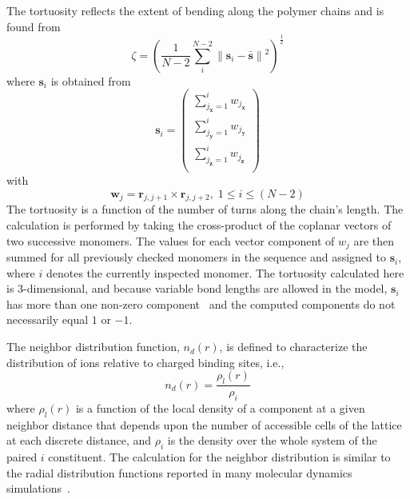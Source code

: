 \documentclass[
journal=jcisd8, %
manuscript=article,
layout=twocolumn   %
]{achemso}
\begin{document}
The tortuosity reflects the extent of bending along the polymer chains and is found from
\begin{equation}
\zeta ={\left(\frac{1}{N-2} \sum _i^{N-2} \lVert\boldsymbol{s}_i-\bar{\boldsymbol{s}}\rVert{}^2\right)}^{\frac{1}{2}}
\end{equation}
where $\boldsymbol{s}_i$ is obtained from
\begin{equation}
\boldsymbol{s}_i= \left( {\begin{array}{cc}
   {\sum_{j_{\boldsymbol{x}}=1}^i w_{j_{\boldsymbol{x}}}} \\
   {\sum_{j_{\boldsymbol{y}}=1}^i w_{j_{\boldsymbol{y}}}} \\
   {\sum_{j_{\boldsymbol{z}}=1}^i w_{j_{\boldsymbol{z}}}} \\
  \end{array} } \right)
  \end{equation}
with
  	\begin{equation}
	\boldsymbol{w}_j=\boldsymbol{r}_{j,j+1}\times \boldsymbol{r}_{j,j+2} , \; 1 \leq i \leq (N-2)
	\end{equation}
The tortuosity is a function of the number of turns along the chain's length. The calculation is performed by taking the cross-product of the coplanar vectors of two successive monomers. The values for each vector component of $w_j$ are then summed for all previously checked monomers in the sequence and assigned to $\boldsymbol{s}_i$, where $i$ denotes the currently inspected monomer.  The tortuosity calculated here is 3-dimensional, and because variable bond lengths are allowed in the model, $\boldsymbol{s}_i$ has more than one non-zero component~\cite{Wust2012} and the computed components do not necessarily equal $1$ or $-1$.

The neighbor distribution function, $n_d(r)$, is defined to characterize the distribution of ions relative to charged binding sites, i.e.,
\begin{equation}
n_d(r)=\frac{\rho_l(r)}{\rho_i}
\label{NDF_equation}
\end{equation}
where ${\rho_l}(r)$ is a function of the local density of a component at a given neighbor distance that depends upon the number of accessible cells of the lattice at each discrete distance, and $\rho_i$ is the density over the whole system of the paired $i$ constituent. The calculation for the neighbor distribution is similar to the radial distribution functions reported in many molecular dynamics simulations~\cite{Archer2022Resins}. 
\end{document}
